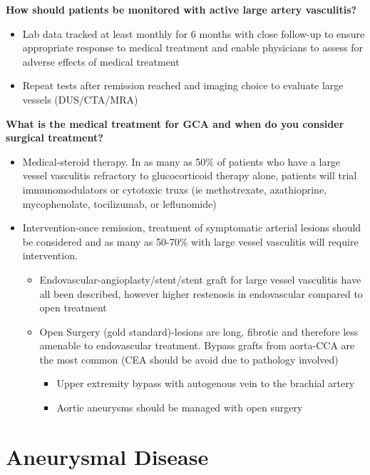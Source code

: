 \documentclass[
]{book}
\begin{document}
\textbf{How should patients be monitored with active large artery
vasculitis?}

\begin{itemize}
\item
  Lab data tracked at least monthly for 6 months with close follow-up
  to ensure appropriate response to medical treatment and enable
  physicians to assess for adverse effects of medical treatment
\item
  Repeat tests after remission reached and imaging choice to evaluate
  large vessels (DUS/CTA/MRA)
\end{itemize}

\textbf{What is the medical treatment for GCA and when do you consider
surgical treatment?}

\begin{itemize}
\item
  Medical-steroid therapy. In as many as 50\% of patients who have a
  large vessel vasculitis refractory to glucocorticoid therapy alone,
  patients will trial immunomodulators or cytotoxic truxs (ie
  methotrexate, azathioprine, mycophenolate, tocilizumab, or
  leflunomide)~
\item
  Intervention-once remission, treatment of symptomatic arterial
  lesions should be considered and as many as 50-70\% with large vessel
  vasculitis will require intervention.~

  \begin{itemize}
  \item
    Endovascular-angioplasty/stent/stent graft for large vessel
    vasculitis have all been described, however higher restenosis in
    endovascular compared to open treatment
  \item
    Open Surgery (gold standard)-lesions are long, fibrotic and
    therefore less amenable to endovascular treatment. Bypass grafts
    from aorta-CCA are the most common (CEA should be avoid due to
    pathology involved)

    \begin{itemize}
    \item
      Upper extremity bypass with autogenous vein to the brachial
      artery
    \item
      Aortic aneurysms should be managed with open surgery~
    \end{itemize}
  \end{itemize}
\end{itemize}

\hypertarget{aneurysmal-disease}{%
\section{Aneurysmal Disease}\label{aneurysmal-disease}}
\end{document}
